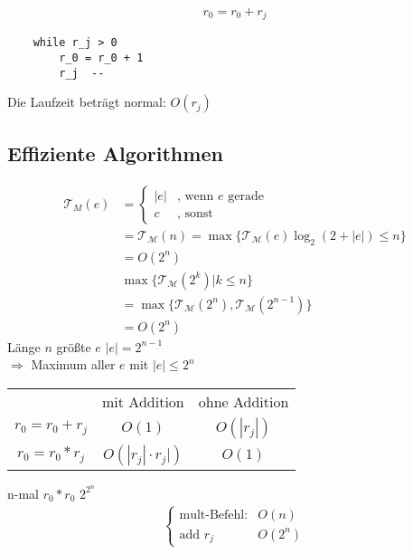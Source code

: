 \begin{align*}
    r_0 = r_0 + r_j
\end{align*}

\begin{verbatim}
    while r_j > 0
        r_0 = r_0 + 1
        r_j  --
\end{verbatim}

Die Laufzeit beträgt normal: $O(r_j)$

\subsection{Effiziente Algorithmen}

\newcommand{\tcal}{\mathcal{T}_{\mathcal{M}}}
\begin{align*}
    \mathcal{T}_M(e) &= \begin{cases}
    |e| & \text{, wenn } e \text{ gerade}\\
    c & \text{, sonst}
    \end{cases}\\
    &= \tcal(n) = \max\{\tcal (e) \log_2(2 + |e|) \leq n\}\\
    &= O(2^n)\\
    &\max \{\tcal(2^k)| k \leq n\}\\
    &= \max \{\tcal(2^n), \tcal(2^{n-1})\}\\
    &= O(2^n)
\end{align*}
Länge $n$ größte $e$ $|e|= 2^{n-1}$\\
$\Rightarrow$ Maximum aller $e$ mit $|e| \leq 2^n$\\

\begin{tabular}{ccc}
    &mit Addition & ohne Addition\\
    $r_0 = r_0 + r_j$&$O(1)$ & $O(|r_j|)$\\
    $r_0 = r_0 * r_j$&$O(|r_j| \cdot r_j|)$ & $O(1)$ 
\end{tabular}

n-mal $r_0 * r_0$ $2^{2^n}$
\begin{align*}
\begin{cases}
\text{mult-Befehl:} & O(n)\\
\text{add } r_j & O(2^n)
\end{cases}
\end{align*}
